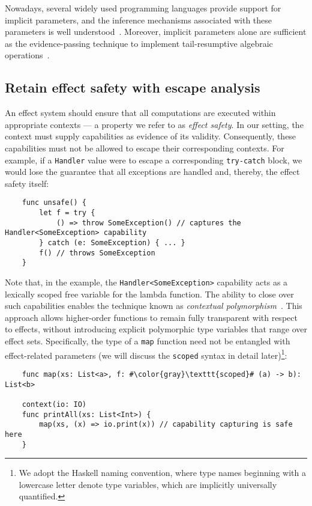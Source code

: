 \documentclass[acmsmall]{acmart}
\begin{document}
Nowadays, several widely used programming languages provide support for implicit parameters, and the inference mechanisms associated with these parameters is well understood~\cite{KEEP-context-parameters, oliveira2010type, lewis2000implicit}.
Moreover, implicit parameters alone are sufficient as the evidence-passing technique to implement tail-resumptive algebraic operations~\cite{xie2020effect}.

\subsection{Retain effect safety with escape analysis} \label{subsec:escape}

An effect system should ensure that all computations are executed within appropriate contexts --- a property we refer to as \textit{effect safety}.
In our setting, the context must supply capabilities as evidence of its validity.
Consequently, these capabilities must not be allowed to escape their corresponding contexts.
For example, if a \texttt{Handler} value were to escape a corresponding \texttt{try-catch} block, we would lose the guarantee that all exceptions are handled and, thereby, the effect safety itself:
\begin{verbatim}
    func unsafe() {
        let f = try {
            () => throw SomeException() // captures the Handler<SomeException> capability
        } catch (e: SomeException) { ... }
        f() // throws SomeException
    }
\end{verbatim}

Note that, in the example, the \texttt{Handler<SomeException>} capability acts as a lexically scoped free variable for the lambda function.
The ability to close over such capabilities enables the technique known as \textit{contextual polymorphism}~\cite{brachthauser2020effects, brachthauser2022effects}.
This approach allows higher-order functions to remain fully transparent with respect to effects, without introducing explicit polymorphic type variables that range over effect sets.
Specifically, the type of a \texttt{map} function need not be entangled with effect-related parameters (we will discuss the \texttt{scoped} syntax in detail later)\footnote{We adopt the Haskell naming convention, where type names beginning with a lowercase letter denote type variables, which are implicitly universally quantified.}:
\begin{verbatim}
    func map(xs: List<a>, f: #\color{gray}\texttt{scoped}# (a) -> b): List<b>

    context(io: IO)
    func printAll(xs: List<Int>) {
        map(xs, (x) => io.print(x)) // capability capturing is safe here
    }
\end{verbatim}
\end{document}
